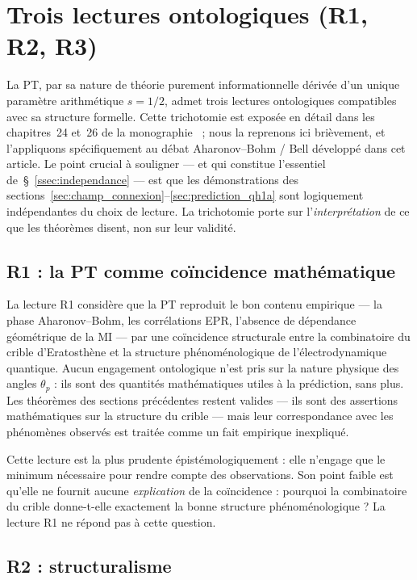 \section{Trois lectures ontologiques (R1, R2, R3)}
\label{sec:lectures_ontologiques}

La PT, par sa nature de théorie purement informationnelle dérivée
d'un unique paramètre arithmétique $s = 1/2$, admet trois lectures
ontologiques compatibles avec sa structure formelle. Cette
trichotomie est exposée en détail dans les chapitres~24 et~26 de
la monographie~\cite{PT_Monograph} ; nous la reprenons ici
brièvement, et l'appliquons spécifiquement au débat
Aharonov--Bohm / Bell développé dans cet article. Le point
crucial à souligner --- et qui constitue l'essentiel
de~\S~\ref{ssec:independance} --- est que les démonstrations des
sections~\ref{sec:champ_connexion}--\ref{sec:prediction_qh1a}
sont logiquement indépendantes du choix de lecture. La trichotomie
porte sur l'\emph{interprétation} de ce que les théorèmes
disent, non sur leur validité.

\subsection{R1 : la PT comme coïncidence mathématique}
\label{ssec:R1}

La lecture R1 considère que la PT reproduit le bon contenu
empirique --- la phase Aharonov--Bohm, les corrélations EPR,
l'absence de dépendance géométrique de la MI --- par une
coïncidence structurale entre la combinatoire du crible
d'Eratosthène et la structure phénoménologique de
l'électrodynamique quantique. Aucun engagement ontologique n'est
pris sur la nature physique des angles $\theta_p$ : ils sont des
quantités mathématiques utiles à la prédiction, sans plus. Les
théorèmes des sections précédentes restent valides --- ils sont
des assertions mathématiques sur la structure du crible --- mais
leur correspondance avec les phénomènes observés est traitée comme
un fait empirique inexpliqué.

Cette lecture est la plus prudente épistémologiquement : elle
n'engage que le minimum nécessaire pour rendre compte des
observations. Son point faible est qu'elle ne fournit aucune
\emph{explication} de la coïncidence : pourquoi la combinatoire
du crible donne-t-elle exactement la bonne structure
phénoménologique ? La lecture R1 ne répond pas à cette question.

\subsection{R2 : structuralisme}
\label{ssec:R2}

